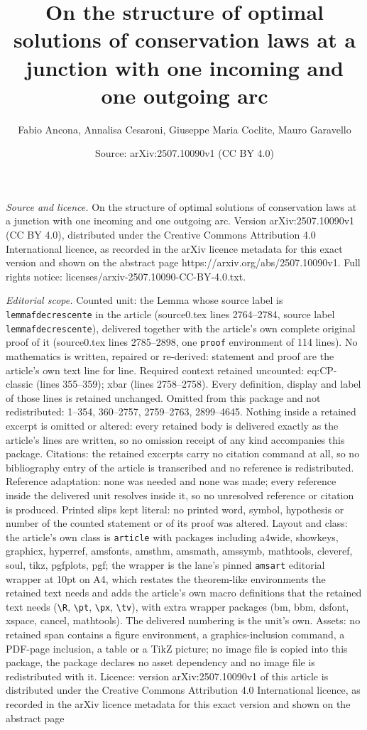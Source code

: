 \documentclass[10pt,a4paper]{amsart}
\title[On the structure of optimal solutions of conservation laws a]{On the structure of optimal solutions of conservation laws at a junction with one incoming and one outgoing arc}
\author{Fabio Ancona, Annalisa Cesaroni, Giuseppe Maria Coclite, Mauro Garavello}
\date{Source: arXiv:2507.10090v1 (CC BY 4.0)}
\begin{document}
\maketitle

\noindent\emph{Source and licence.} On the structure of optimal solutions of conservation laws at a junction with one incoming and one outgoing arc. Version arXiv:2507.10090v1 (CC BY 4.0), distributed under the Creative Commons Attribution 4.0 International licence, as recorded in the arXiv licence metadata for this exact version and shown on the abstract page https://arxiv.org/abs/2507.10090v1. Full rights notice: licenses/arxiv-2507.10090-CC-BY-4.0.txt.\par\smallskip

\noindent\textit{Editorial scope.} Counted unit: the Lemma whose source label is \texttt{lemmafdecrescente} in the article (source0.tex lines 2764--2784, source label \texttt{lemmafdecrescente}), delivered together with the article's own complete original proof of it (source0.tex lines 2785--2898, one \texttt{proof} environment of 114 lines). No mathematics is written, repaired or re-derived: statement and proof are the article's own text line for line. Required context retained uncounted: eq:CP-classic (lines 355--359); xbar (lines 2758--2758). Every definition, display and label of those lines is retained unchanged. Omitted from this package and not redistributed: 1--354, 360--2757, 2759--2763, 2899--4645. Nothing inside a retained excerpt is omitted or altered: every retained body is delivered exactly as the article's lines are written, so no omission receipt of any kind accompanies this package. Citations: the retained excerpts carry no citation command at all, so no bibliography entry of the article is transcribed and no reference is redistributed. Reference adaptation: none was needed and none was made; every reference inside the delivered unit resolves inside it, so no unresolved reference or citation is produced. Printed slips kept literal: no printed word, symbol, hypothesis or number of the counted statement or of its proof was altered. Layout and class: the article's own class is \texttt{article} with packages including a4wide, showkeys, graphicx, hyperref, amsfonts, amsthm, amsmath, amssymb, mathtools, cleveref, soul, tikz, pgfplots, pgf; the wrapper is the lane's pinned \texttt{amsart} editorial wrapper at 10pt on A4, which restates the theorem-like environments the retained text needs and adds the article's own macro definitions that the retained text needs (\texttt{\textbackslash R}, \texttt{\textbackslash pt}, \texttt{\textbackslash px}, \texttt{\textbackslash tv}), with extra wrapper packages (bm, bbm, dsfont, xspace, cancel, mathtools). The delivered numbering is the unit's own. Assets: no retained span contains a figure environment, a graphics-inclusion command, a PDF-page inclusion, a table or a TikZ picture; no image file is copied into this package, the package declares no asset dependency and no image file is redistributed with it. Licence: version arXiv:2507.10090v1 of this article is distributed under the Creative Commons Attribution 4.0 International licence, as recorded in the arXiv licence metadata for this exact version and shown on the abstract page 
\end{document}
